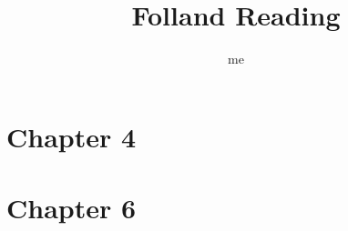 \documentclass[12pt, oneside]{article}
\title{Folland Reading}
\author{me}
\begin{document}
\maketitle

\section{Chapter 4}

\section{Chapter 6}









\newpage
\end{document}
